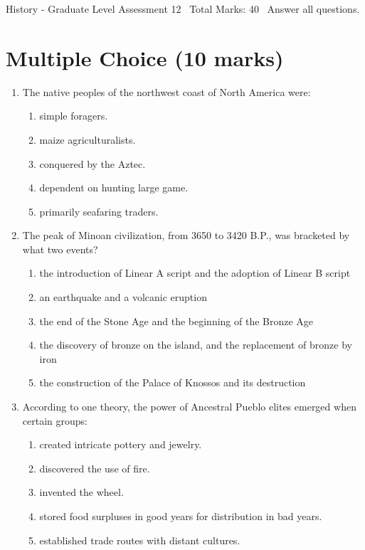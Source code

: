 \documentclass[12pt]{article}
\begin{document}
\begin{center}
History - Graduate Level Assessment 12 \
Total Marks: 40 \
Answer all questions.
\end{center}

\section*{Multiple Choice (10 marks)}
\begin{enumerate}[label=\arabic*.]
\item The native peoples of the northwest coast of North America were:
\begin{enumerate}[label=(\alph*)]
    \item simple foragers.
    \item maize agriculturalists.
    \item conquered by the Aztec.
    \item dependent on hunting large game.
    \item primarily seafaring traders.
\end{enumerate}
\item The peak of Minoan civilization, from 3650 to 3420 B.P., was bracketed by what two events?
\begin{enumerate}[label=(\alph*)]
    \item the introduction of Linear A script and the adoption of Linear B script
    \item an earthquake and a volcanic eruption
    \item the end of the Stone Age and the beginning of the Bronze Age
    \item the discovery of bronze on the island, and the replacement of bronze by iron
    \item the construction of the Palace of Knossos and its destruction
\end{enumerate}
\item According to one theory, the power of Ancestral Pueblo elites emerged when certain groups:
\begin{enumerate}[label=(\alph*)]
    \item created intricate pottery and jewelry.
    \item discovered the use of fire.
    \item invented the wheel.
    \item stored food surpluses in good years for distribution in bad years.
    \item established trade routes with distant cultures.

\end{enumerate}
\end{enumerate}
\end{document}
